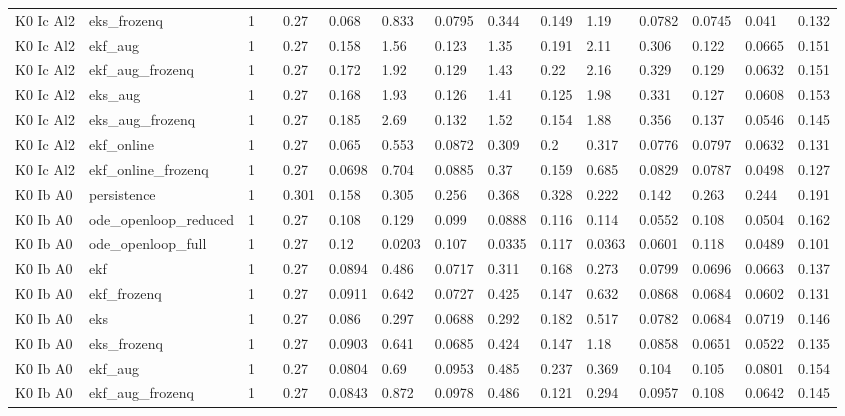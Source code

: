 \begin{table}[t]
\begin{tabular}{lllllllllllllll}
K0 Ic Al2 & eks\_frozenq & 1 &  & 0.27 & 0.068 & 0.833 & 0.0795 & 0.344 & 0.149 & 1.19 & 0.0782 & 0.0745 & 0.041 & 0.132 \\
K0 Ic Al2 & ekf\_aug & 1 &  & 0.27 & 0.158 & 1.56 & 0.123 & 1.35 & 0.191 & 2.11 & 0.306 & 0.122 & 0.0665 & 0.151 \\
K0 Ic Al2 & ekf\_aug\_frozenq & 1 &  & 0.27 & 0.172 & 1.92 & 0.129 & 1.43 & 0.22 & 2.16 & 0.329 & 0.129 & 0.0632 & 0.151 \\
K0 Ic Al2 & eks\_aug & 1 &  & 0.27 & 0.168 & 1.93 & 0.126 & 1.41 & 0.125 & 1.98 & 0.331 & 0.127 & 0.0608 & 0.153 \\
K0 Ic Al2 & eks\_aug\_frozenq & 1 &  & 0.27 & 0.185 & 2.69 & 0.132 & 1.52 & 0.154 & 1.88 & 0.356 & 0.137 & 0.0546 & 0.145 \\
K0 Ic Al2 & ekf\_online & 1 &  & 0.27 & 0.065 & 0.553 & 0.0872 & 0.309 & 0.2 & 0.317 & 0.0776 & 0.0797 & 0.0632 & 0.131 \\
K0 Ic Al2 & ekf\_online\_frozenq & 1 &  & 0.27 & 0.0698 & 0.704 & 0.0885 & 0.37 & 0.159 & 0.685 & 0.0829 & 0.0787 & 0.0498 & 0.127 \\
K0 Ib A0 & persistence & 1 &  & 0.301 & 0.158 & 0.305 & 0.256 & 0.368 & 0.328 & 0.222 & 0.142 & 0.263 & 0.244 & 0.191 \\
K0 Ib A0 & ode\_openloop\_reduced & 1 &  & 0.27 & 0.108 & 0.129 & 0.099 & 0.0888 & 0.116 & 0.114 & 0.0552 & 0.108 & 0.0504 & 0.162 \\
K0 Ib A0 & ode\_openloop\_full & 1 &  & 0.27 & 0.12 & 0.0203 & 0.107 & 0.0335 & 0.117 & 0.0363 & 0.0601 & 0.118 & 0.0489 & 0.101 \\
K0 Ib A0 & ekf & 1 &  & 0.27 & 0.0894 & 0.486 & 0.0717 & 0.311 & 0.168 & 0.273 & 0.0799 & 0.0696 & 0.0663 & 0.137 \\
K0 Ib A0 & ekf\_frozenq & 1 &  & 0.27 & 0.0911 & 0.642 & 0.0727 & 0.425 & 0.147 & 0.632 & 0.0868 & 0.0684 & 0.0602 & 0.131 \\
K0 Ib A0 & eks & 1 &  & 0.27 & 0.086 & 0.297 & 0.0688 & 0.292 & 0.182 & 0.517 & 0.0782 & 0.0684 & 0.0719 & 0.146 \\
K0 Ib A0 & eks\_frozenq & 1 &  & 0.27 & 0.0903 & 0.641 & 0.0685 & 0.424 & 0.147 & 1.18 & 0.0858 & 0.0651 & 0.0522 & 0.135 \\
K0 Ib A0 & ekf\_aug & 1 &  & 0.27 & 0.0804 & 0.69 & 0.0953 & 0.485 & 0.237 & 0.369 & 0.104 & 0.105 & 0.0801 & 0.154 \\
K0 Ib A0 & ekf\_aug\_frozenq & 1 &  & 0.27 & 0.0843 & 0.872 & 0.0978 & 0.486 & 0.121 & 0.294 & 0.0957 & 0.108 & 0.0642 & 0.145 \\

\end{tabular}
\end{table}
